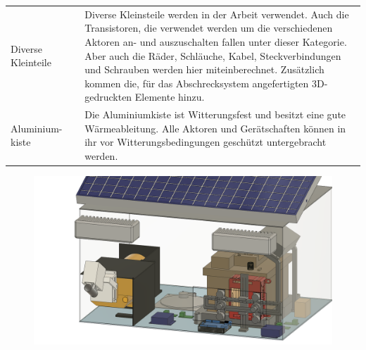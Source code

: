\begin{longtable}{ p{}|p{}|p{} }
    \\
    Diverse Kleinteile
    & \centering{25 + X}
    & Diverse Kleinsteile werden in der Arbeit verwendet. Auch die Transistoren, die verwendet werden um die verschiedenen Aktoren an- und auszuschalten fallen unter dieser Kategorie. Aber auch die Räder, Schläuche, Kabel, Steckverbindungen und Schrauben werden hier miteinberechnet. Zusätzlich kommen die, für das Abschrecksystem angefertigten 3D-gedruckten Elemente hinzu.
    \\
    Aluminium-kiste
    & \centering{109 DM}
    & Die Aluminiumkiste ist Witterungsfest und besitzt eine gute Wärmeableitung. Alle Aktoren und Gerätschaften können in ihr vor Witterungsbedingungen geschützt untergebracht werden.
\end{longtable}

\begin{figure}[h]
    \centering
    \includegraphics[width=\textwidth]{images/whole_box.png}
    \label{fig:whole_thing}
\end{figure}
